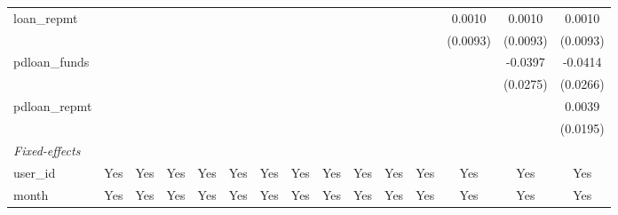 \begin{table}[htbp]
\begin{tabular}{lcccccccccccccc}
      loan\_repmt             &                 &                 &                 &                 &                 &                 &                 &                 &                 &                 &                 & 0.0010          & 0.0010          & 0.0010\\
                               &                 &                 &                 &                 &                 &                 &                 &                 &                 &                 &                 & (0.0093)        & (0.0093)        & (0.0093)\\
      pdloan\_funds           &                 &                 &                 &                 &                 &                 &                 &                 &                 &                 &                 &                 & -0.0397         & -0.0414\\
                               &                 &                 &                 &                 &                 &                 &                 &                 &                 &                 &                 &                 & (0.0275)        & (0.0266)\\
      pdloan\_repmt           &                 &                 &                 &                 &                 &                 &                 &                 &                 &                 &                 &                 &                 & 0.0039\\
                               &                 &                 &                 &                 &                 &                 &                 &                 &                 &                 &                 &                 &                 & (0.0195)\\
      \midrule \emph{Fixed-effects} &   &   &   &   &   &   &   &   &   &   &   &   &   &  \\
      user\_id                & Yes             & Yes             & Yes             & Yes             & Yes             & Yes             & Yes             & Yes             & Yes             & Yes             & Yes             & Yes             & Yes             & Yes\\
      month                    & Yes             & Yes             & Yes             & Yes             & Yes             & Yes             & Yes             & Yes             & Yes             & Yes             & Yes             & Yes             & Yes             & Yes\\

\end{tabular}
\end{table}
